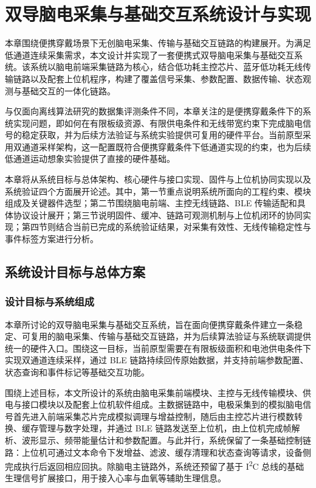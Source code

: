 \chapter{双导脑电采集与基础交互系统设计与实现}
\label{cha:hardware}

本章围绕便携穿戴场景下无创脑电采集、传输与基础交互链路的构建展开。为满足低通道连续采集需求，本文设计并实现了一套便携式双导脑电采集与基础交互系统。该系统以脑电前端采集链路为核心，结合低功耗主控芯片、蓝牙低功耗无线传输链路以及配套上位机程序，构建了覆盖信号采集、参数配置、数据传输、状态观测与基础交互的一体化链路。

与仅面向离线算法研究的数据集评测条件不同，本章关注的是便携穿戴条件下的系统实现问题，即如何在有限板级资源、有限供电条件和无线带宽约束下完成脑电信号的稳定获取，并为后续方法验证与系统实验提供可复用的硬件平台。当前原型采用双通道采样架构，这一配置既符合便携穿戴条件下低通道实现的约束，也为后续低通道运动想象实验提供了直接的硬件基础。

本章将从系统目标与总体架构、核心硬件与接口实现、固件与上位机协同实现以及系统验证四个方面展开论述。其中，第一节重点说明系统所面向的工程约束、模块组成及关键器件选型；第二节围绕脑电前端、主控无线链路、BLE 传输适配和具体协议设计展开；第三节说明固件、缓冲、链路可观测机制与上位机闭环的协同实现；第四节则结合当前已完成的系统验证结果，对采集有效性、无线传输稳定性与事件标签方案进行分析。

\section{系统设计目标与总体方案}

\subsection{设计目标与系统组成}

本章所讨论的双导脑电采集与基础交互系统，旨在面向便携穿戴条件建立一条稳定、可复用的脑电采集、传输与基础交互链路，并为后续算法验证与系统联调提供统一的硬件入口。围绕这一目标，当前原型需要在有限板级面积和电池供电条件下实现双通道连续采样，通过 BLE 链路持续回传原始数据，并支持前端参数配置、状态查询和事件标记等基础交互功能。

围绕上述目标，本文所设计的系统由脑电采集前端模块、主控与无线传输模块、供电与接口模块以及配套上位机软件组成。主数据链路中，电极采集到的模拟脑电信号首先进入前端采集芯片完成模拟调理与增益控制，随后由主控芯片进行模数转换、缓存管理与数字处理，并通过 BLE 链路发送至上位机，由上位机完成帧解析、波形显示、频带能量估计和参数配置。与此并行，系统保留了一条基础控制链路：上位机可通过文本命令下发增益、滤波、缓存清理和状态查询等请求，设备侧完成执行后返回相应回执。除脑电主链路外，系统还预留了基于 I\textsuperscript{2}C 总线的基础生理信号扩展接口，用于接入心率与血氧等辅助生理信息。

